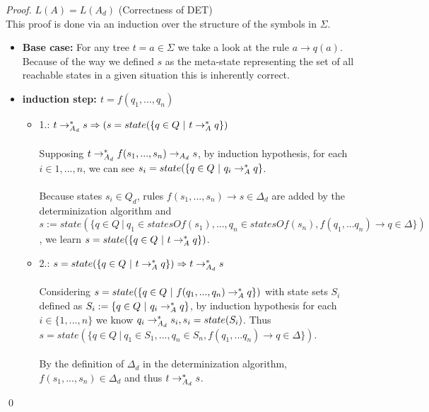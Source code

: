 \documentclass{llncs}
\begin{document}
\begin{proof}{\(L(A) = L(A_d)\) (Correctness of DET) \cite{tata-nfta}}\\
	This proof is done via an induction over the structure of the symbols in \(\Sigma\).
	\begin{itemize}
		\item \textbf{Base case:}
			For any tree \(t = a \in \Sigma\) we take a look at the rule \(a \rightarrow q(a)\). Because of the way we defined \(s\) as the meta-state representing the set of all reachable states in a given situation this is inherently correct.
			\\
		\item \textbf{induction step: \(t = f(q_1,... , q_n)\)}
			\begin{itemize}
				\item 
				1.: \(t \rightarrow_{A_d}^* s \Rightarrow (s = state(\{q \in Q ~|~ t \rightarrow_A^* q\})\)\\\\
				Supposing \(t \rightarrow_{A_d}^* f(s_1, ..., s_n) \rightarrow_{A_d} s\), by induction hypothesis, for each \(i \in {1,..., n}\), we can see \(s_i = state(\{q \in Q ~|~ q_i \rightarrow_A^* q\}\).\\
				\\
			    Because states \(s_i \in Q_d\), rules \(f(s_1, ..., s_n) \rightarrow s \in \Delta_d\) are added by the determinization algorithm and \( s := state(\{ q \in Q ~|~ q_1 \in statesOf(s_1),..., q_n \in statesOf(s_n), f(q_1,...q_n) \rightarrow q \in \Delta \}) \), we learn \(s = state(\{q \in Q ~|~ t \rightarrow_A^* q\})\).
				\\
				\item
				2.: \(s = state(\{q \in Q ~|~ t \rightarrow_A^* q\}) \Rightarrow t \rightarrow_{A_d}^* s\)\\\\
				Considering \(s = state(\{q \in Q ~|~ f(q_1, ..., q_n) \rightarrow_A^* q\})\) with state sets \(S_i\) defined as \(S_i := \{q \in Q ~|~ q_i \rightarrow_A^* q\}\), by induction hypothesis for each \(i \in \{1, ..., n\}\) we know \(q_i \rightarrow_{A_d}^* s_i, s_i = state(S_i)\).
				Thus \( s = state(\{ q \in Q ~|~ q_1 \in S_1,..., q_n \in S_n, f(q_1,...q_n) \rightarrow q \in \Delta \}) \).\\
				\\
				By the definition of \(\Delta_d\) in the determinization algorithm, \(f(s_1, ..., s_n) \in \Delta_d\) and thus \(t \rightarrow_{A_d}^* s\).
			\end{itemize}
	\end{itemize}
	\qed
\end{proof}
\end{document}
